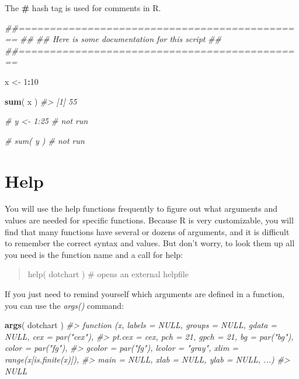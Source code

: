 \documentclass[]{book}
\newenvironment{Shaded}{\begin{snugshade}}{\end{snugshade}}
\newcommand{\CommentTok}[1]{\textcolor[rgb]{0.56,0.35,0.01}{\textit{#1}}}
\newcommand{\DecValTok}[1]{\textcolor[rgb]{0.00,0.00,0.81}{#1}}
\newcommand{\KeywordTok}[1]{\textcolor[rgb]{0.13,0.29,0.53}{\textbf{#1}}}
\newcommand{\NormalTok}[1]{#1}
\newcommand{\OperatorTok}[1]{\textcolor[rgb]{0.81,0.36,0.00}{\textbf{#1}}}
\newcommand{\StringTok}[1]{\textcolor[rgb]{0.31,0.60,0.02}{#1}}
\theoremstyle{definition}
\theoremstyle{definition}
\theoremstyle{definition}
\theoremstyle{remark}
\begin{document}
The \textbf{\#} hash tag is used for comments in R.

\begin{Shaded}
\begin{Highlighting}[]

\CommentTok{##==============================================}
\CommentTok{##}
\CommentTok{##  Here is some documentation for this script}
\CommentTok{##}
\CommentTok{##==============================================}

\NormalTok{x <-}\StringTok{ }\DecValTok{1}\OperatorTok{:}\DecValTok{10}

\KeywordTok{sum}\NormalTok{( x )}
\CommentTok{#> [1] 55}

\CommentTok{# y <- 1:25     # not run}

\CommentTok{# sum( y )      # not run}
\end{Highlighting}
\end{Shaded}

\hypertarget{help}{%
\section{Help}\label{help}}

You will use the help functions frequently to figure out what arguments
and values are needed for specific functions. Because R is very
customizable, you will find that many functions have several or dozens
of arguments, and it is difficult to remember the correct syntax and
values. But don't worry, to look them up all you need is the function
name and a call for help:

\begin{quote}
help( dotchart ) \# opens an external helpfile
\end{quote}

If you just need to remind yourself which arguments are defined in a
function, you can use the \emph{args()} command:

\begin{Shaded}
\begin{Highlighting}[]
\KeywordTok{args}\NormalTok{( dotchart )}
\CommentTok{#> function (x, labels = NULL, groups = NULL, gdata = NULL, cex = par("cex"), }
\CommentTok{#>     pt.cex = cex, pch = 21, gpch = 21, bg = par("bg"), color = par("fg"), }
\CommentTok{#>     gcolor = par("fg"), lcolor = "gray", xlim = range(x[is.finite(x)]), }
\CommentTok{#>     main = NULL, xlab = NULL, ylab = NULL, ...) }
\CommentTok{#> NULL}
\end{Highlighting}
\end{Shaded}
\end{document}
